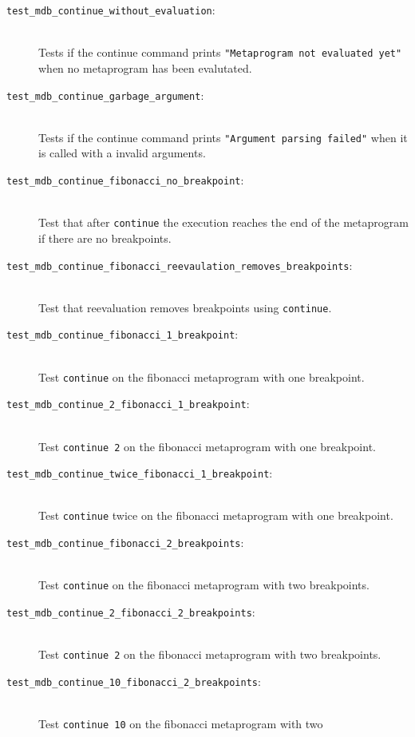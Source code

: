 \begin{description}
    \item[\texttt{test\_mdb\_continue\_without\_evaluation}:] \hfill \\
        Tests if the continue command prints
        \texttt{"Metaprogram not evaluated yet"} when no metaprogram has been
        evalutated.
    \item[\texttt{test\_mdb\_continue\_garbage\_argument}:] \hfill \\
        Tests if the continue command prints
        \texttt{"Argument parsing failed"} when it is called with a invalid
        arguments.
    \item[\texttt{test\_mdb\_continue\_fibonacci\_no\_breakpoint}:] \hfill \\
        Test that after \texttt{continue} the execution reaches the end of the
        metaprogram if there are no breakpoints.
    \item[\texttt{test\_mdb\_continue\_fibonacci\_reevaulation\_removes\_breakpoints}:] \hfill \\
        Test that reevaluation removes breakpoints using \texttt{continue}.
    \item[\texttt{test\_mdb\_continue\_fibonacci\_1\_breakpoint}:] \hfill \\
        Test \texttt{continue} on the fibonacci metaprogram with one
        breakpoint.
    \item[\texttt{test\_mdb\_continue\_2\_fibonacci\_1\_breakpoint}:] \hfill \\
        Test \texttt{continue 2} on the fibonacci metaprogram with one
        breakpoint.
    \item[\texttt{test\_mdb\_continue\_twice\_fibonacci\_1\_breakpoint}:] \hfill \\
        Test \texttt{continue} twice on the fibonacci metaprogram with one
        breakpoint.
    \item[\texttt{test\_mdb\_continue\_fibonacci\_2\_breakpoints}:] \hfill \\
        Test \texttt{continue} on the fibonacci metaprogram with two
        breakpoints.
    \item[\texttt{test\_mdb\_continue\_2\_fibonacci\_2\_breakpoints}:] \hfill \\
        Test \texttt{continue 2} on the fibonacci metaprogram with two
        breakpoints.
    \item[\texttt{test\_mdb\_continue\_10\_fibonacci\_2\_breakpoints}:] \hfill \\
        Test \texttt{continue 10} on the fibonacci metaprogram with two

\end{description}
